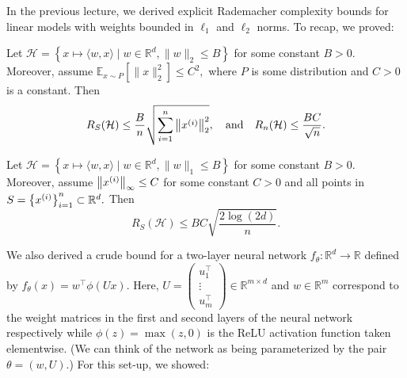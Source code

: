 \setcounter{section}{0}

\newcommand{\gammamin}{\gamma_{\mathrm{min}}}
\newcommand{\phirelu}{\phi_{\text{ReLU}}}
\newcommand{\supunitball}{\sup_{\overline{u}:\norm{\overline{u}}_2 \le 1}}
\newcommand{\ubar}{\overline{u}}


In the previous lecture, we derived explicit Rademacher complexity bounds for linear models with weights bounded in $\ell_1$ and $\ell_2$ norms. To recap, we proved:

\begin{theorem}\label{lec8:thm:thm7.1}
Let $\mathcal{H}=\left\{x \mapsto\langle w, x\rangle \mid w \in \mathbb{R}^{d},\|w\|_{2} \leq B\right\}$ for some constant $B>0 .$ Moreover, assume $\mathbb{E}_{x \sim P}\left[\|x\|_{2}^{2}\right] \leq C^{2},$ where $P$ is some distribution and $C>0$ is a constant. Then
\begin{equation}
R_{S}(\mathcal{H}) \leq \frac{B}{n} \sqrt{\sum_{i=1}^{n}\left\|x\sp{i}\right\|_{2}^{2}}, \quad\text{and}\quad 
R_n(\mathcal{H}) \leq \frac{BC}{\sqrt{n}}.
\end{equation}
\end{theorem}

\begin{theorem}\label{lec8:thm:thm7.3}
Let $\mathcal{H}=\left\{x \mapsto\langle w, x\rangle \mid w \in \mathbb{R}^{d},\|w\|_{1} \leq B\right\}$ for some constant $B>0$. Moreover, assume $\left\|x\sp{i}\right\|_{\infty} \leq C$ for some constant $C>0$ and all points in $S=\left\{x\sp{i}\right\}_{i=1}^{n} \subset \mathbb{R}^{d} .$ Then
\begin{equation}
R_{S}(\mathcal{H}) \leq B C \sqrt{\frac{2 \log (2 d)}{n}}.
\end{equation}
\end{theorem}

We also derived a crude bound for a two-layer neural network $f_{\theta}: \mathbb{R}^d \to \mathbb{R}$ defined by $f_{\theta}(x) = w^\top \phi (Ux)$. Here, $U = \begin{pmatrix}
u_1^\top \\
\vdots \\
u_m^\top
\end{pmatrix} \in \mathbb{R}^{m \times d}$ and $w \in \mathbb{R}^m$ correspond to the weight matrices in the first and second layers of the neural network respectively while $\phi(z) = \max(z, 0)$ is the ReLU activation function taken elementwise. (We can think of the network as being parameterized by the pair $\theta = (w, U)$.) For this set-up, we showed:

